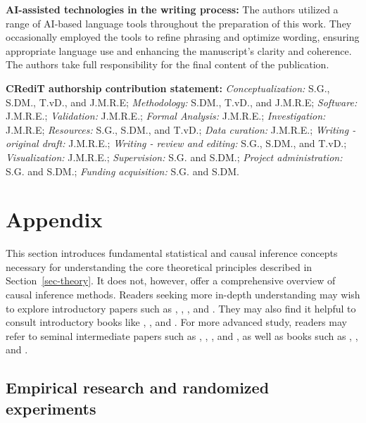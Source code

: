 \documentclass[
  authoryear,
  review,
  1p]{elsarticle}
\begin{document}
\textbf{AI-assisted technologies in the writing process:} The authors
utilized a range of AI-based language tools throughout the preparation
of this work. They occasionally employed the tools to refine phrasing
and optimize wording, ensuring appropriate language use and enhancing
the manuscript's clarity and coherence. The authors take full
responsibility for the final content of the publication.

\textbf{CRediT authorship contribution statement:}
\emph{Conceptualization:} S.G., S.DM., T.vD., and J.M.R.E;
\emph{Methodology:} S.DM., T.vD., and J.M.R.E; \emph{Software:}
J.M.R.E.; \emph{Validation:} J.M.R.E.; \emph{Formal Analysis:} J.M.R.E.;
\emph{Investigation:} J.M.R.E; \emph{Resources:} S.G., S.DM., and T.vD.;
\emph{Data curation:} J.M.R.E.; \emph{Writing - original draft:}
J.M.R.E.; \emph{Writing - review and editing:} S.G., S.DM., and T.vD.;
\emph{Visualization:} J.M.R.E.; \emph{Supervision:} S.G. and S.DM.;
\emph{Project administration:} S.G. and S.DM.; \emph{Funding
acquisition:} S.G. and S.DM.

\newpage{}

\section{Appendix}\label{sec-appendix}

This section introduces fundamental statistical and causal inference
concepts necessary for understanding the core theoretical principles
described in Section~\ref{sec-theory}. It does not, however, offer a
comprehensive overview of causal inference methods. Readers seeking more
in-depth understanding may wish to explore introductory papers such as
\citet{Pearl_2010}, \citet{Rohrer_2018}, \citet{Pearl_2019}, and
\citet{Cinelli_et_al_2020}. They may also find it helpful to consult
introductory books like \citet{Pearl_et_al_2018}, \citet{Neal_2020}, and
\citet{McElreath_2020}. For more advanced study, readers may refer to
seminal intermediate papers such as \citet{Neyman_et_al_1923},
\citet{Rubin_1974}, \citet{Spirtes_et_al_1991}, and \citet{Sekhon_2009},
as well as books such as \citet{Pearl_2009}, \citet{Morgan_et_al_2014},
and \citet{Hernan_et_al_2020}.

\subsection{Empirical research and randomized
experiments}\label{sec-appendix-A}
\end{document}
